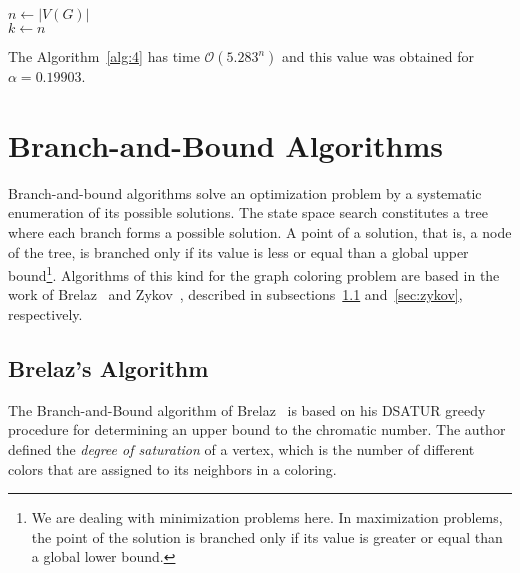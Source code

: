 \documentclass[fleqn,10pt]{SelfArx} %
\newcommand{\cO}{\mathcal{O}}
\begin{document}
	\begin{algorithm}[h]
		\SetAlgoNoLine
		$n \gets |V(G)|$\\
		$k \gets n$\\
		\caption{\textsc{$\chi(G,\alpha)$}}\label{alg:4}
	\end{algorithm}
	
	The Algorithm~\ref{alg:4} has time $\cO(5.283^n)$ and this
	value was obtained for $\alpha = 0.19903$.
	
	
	\section{Branch-and-Bound Algorithms}\label{sec:bb}
	
	Branch-and-bound algorithms solve an optimization problem by a
	systematic enumeration of its possible solutions. The state space
	search constitutes a tree where each branch forms a possible
	solution. A point of a solution, that is, a node of the tree, is
	branched only if its value is less or equal than a global upper
	bound\footnote{We are dealing with minimization problems here. In maximization problems, the point of the solution is branched only if its value is greater or equal than a global lower bound.}. Algorithms of this kind for the graph coloring problem are
	based in the work of Brelaz~\cite{Brelaz79} and Zykov~\cite{Zykov1952}, described in subsections~\ref{sub:brelaz} and~\ref{sec:zykov}, respectively.
	
	\subsection{Brelaz's Algorithm}\label{sub:brelaz}
	
	The Branch-and-Bound algorithm of Brelaz~\cite{Brelaz79} is based on
	his \textsf{DSATUR} greedy procedure for determining an upper bound to the
	chromatic number. The author defined the \emph{degree of saturation}
	of a vertex, which is the number of different colors that are assigned to its neighbors in a coloring.
	
\end{document}
